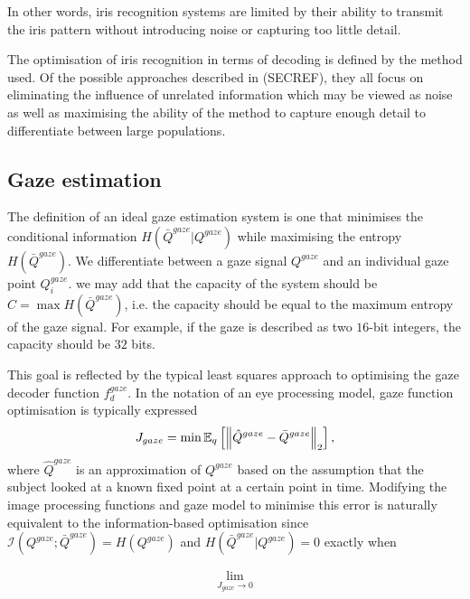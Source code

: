 In other words, iris recognition systems are limited by their ability to transmit the iris pattern without introducing noise or capturing too little detail.

The optimisation of iris recognition in terms of decoding is defined by the method used. Of the possible approaches described in (SECREF), they all focus on eliminating the influence of unrelated information which may be viewed as noise as well as maximising the ability of the method to capture enough detail to differentiate between large populations. 

\subsection{Gaze estimation}\label{sec:gaze-goal}


The definition of an ideal gaze estimation system is one that minimises the conditional information $H(\bar{Q}^{gaze}|Q^{gaze})$ while maximising the entropy $H(\bar{Q}^{gaze})$. We differentiate between a gaze signal $Q^{gaze}$ and an individual gaze point $Q^{gaze}_i$. we may add that the capacity of the system should be $C = \max H(\bar{Q}^{gaze})$, i.e. the capacity should be equal to the maximum entropy of the gaze signal. For example, if the gaze is described as two $16$-bit integers, the capacity should be $32$ bits. 
 

This goal is reflected by the typical least squares approach to optimising the gaze decoder function $f^{gaze}_d$. In the notation of an eye processing model, gaze function optimisation is typically expressed
\begin{align}
    J_{gaze} = \min \mathbb{E}_{q}\left[\left\lVert\hat{Q}^{gaze} - \bar{Q}^{gaze}\right\rVert_2\right],
\end{align}
where $\hat{Q}^{gaze}$ is an approximation of $Q^{gaze}$ based on the assumption that the subject looked at a known fixed point at a certain point in time. Modifying the image processing functions and gaze model to minimise this error is naturally equivalent to the information-based optimisation since $\mathcal{I}(Q^{gaze};\bar{Q}^{gaze})=H(Q^{gaze})$ and $H(\bar{Q}^{gaze}|Q^{gaze})=0$ exactly when 

\begin{align}
	\lim_{J_{gaze}\rightarrow 0}
\end{align}


